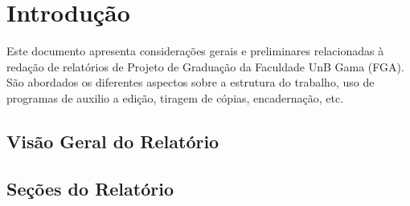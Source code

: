 \chapter[Introdução]{Introdução}

Este documento apresenta considerações gerais e preliminares relacionadas
à redação de relatórios de Projeto de Graduação da Faculdade UnB Gama
(FGA). São abordados os diferentes aspectos sobre a estrutura do trabalho,
uso de programas de auxilio a edição, tiragem de cópias, encadernação, etc.

\section{Visão Geral do Relatório}

\section{Seções do Relatório}

